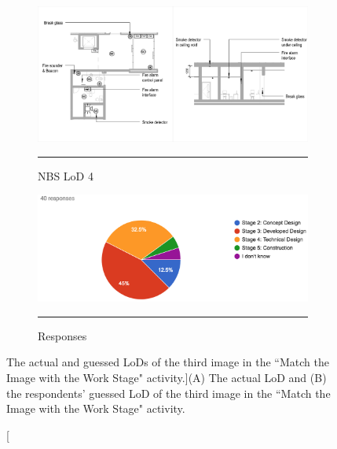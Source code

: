 \begin{figure}[htbp]
\centering
  \begin{subfigure}[b]{.35\textwidth}
  \centering
  \includegraphics[width=\textwidth]{figures/fire-combined.png}
		\rule{\textwidth}{0.5pt} %
  \caption{NBS LoD 4}
  \label{}
\end{subfigure}
  \begin{subfigure}[b]{.61\textwidth}
  \centering
  \includegraphics[width=\textwidth]{figures/image3.png}
		\rule{\textwidth}{0.5pt} %
  \caption{Responses}
  \label{}
\end{subfigure}
\caption[The actual and guessed LoDs of the third image in the ``Match the Image with the Work Stage" activity.]{({\scriptsize A}) The actual LoD and ({\scriptsize B}) the respondents’ guessed LoD of the third image in the ``Match the Image with the Work Stage" activity.}
\label{image3}
\end{figure}



